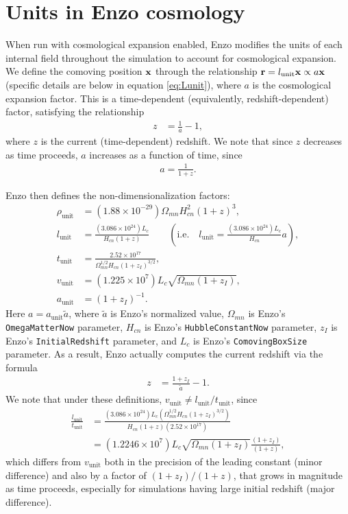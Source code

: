 \documentclass[10pt]{article}
\renewcommand{\(}{\left(}
\renewcommand{\)}{\right)}
\newcommand{\xvec}{{\bf x}}
\newcommand{\rvec}{{\bf r}}
\newcommand{\Aunit}{a_{\text{unit}}}
\newcommand{\Lunit}{l_{\text{unit}}}
\newcommand{\Dunit}{\rho_{\text{unit}}}
\newcommand{\Tunit}{t_{\text{unit}}}
\newcommand{\Vunit}{v_{\text{unit}}}
\newcommand{\tA}{\tilde{a}}
\begin{document}
\section{Units in Enzo cosmology}
\label{sec:units}

When run with cosmological expansion enabled, Enzo modifies the
units of each internal field throughout the simulation to account for
cosmological expansion.  We define the comoving position $\xvec$
through the relationship $\rvec = \Lunit\xvec \propto a \xvec$
(specific details are below in equation \eqref{eq:Lunit}), where $a$
is the cosmological expansion factor.  This is a time-dependent
(equivalently, redshift-dependent) factor, satisfying the relationship
\begin{align}
  \label{eq:CurrentRedshift}
  z &= \frac{1}{a} - 1,
\end{align}
where $z$ is the current (time-dependent) redshift.  We note that
since $z$ decreases as time proceeds, $a$ increases as a function of
time, since 
\begin{align}
  \label{eq:expansion_factor}
  a = \frac{1}{1+z}.
\end{align}

Enzo then defines the non-dimensionalization factors:
\begin{align}
  \label{eq:Dunit}
  \Dunit &= (1.88\times10^{-29}) \Omega_{mn} H_{cn}^2 (1 + z)^3, \\
  \label{eq:Lunit}
  \Lunit &= \frac{(3.086\times10^{24}) L_c}{H_{cn} (1 + z)}
          \qquad \left(\text{i.e.}\quad \Lunit = \frac{(3.086\times10^{24}) L_c}{H_{cn}}a\right), \\
  \label{eq:Tunit}
  \Tunit &= \frac{2.52\times10^{17}}{\Omega_{mn}^{1/2} H_{cn} (1 + z_I)^{3/2}}, \\
  \label{eq:Vunit}
  \Vunit &= (1.225\times10^{7}) L_c \sqrt{\Omega_{mn}(1 + z_I)}, \\
  \label{eq:Aunit}
  \Aunit &= (1+z_I)^{-1}.
\end{align}
Here $a = \Aunit \tA$, where $\tA$ is Enzo's normalized value,  
$\Omega_{mn}$ is Enzo's {\tt OmegaMatterNow} parameter, 
$H_{cn}$ is Enzo's {\tt HubbleConstantNow} parameter, 
$z_I$ is Enzo's {\tt InitialRedshift} parameter, and
$L_c$ is Enzo's {\tt ComovingBoxSize} parameter.
As a result, Enzo actually computes the current redshift via the
formula 
\begin{align}
  \label{eq:CurrentRedshiftFormula}
  z &= \frac{1 + z_I}{\tA} - 1.
\end{align}
We note that under these definitions, $\Vunit \ne \Lunit / \Tunit$, since
\begin{align*}
   \frac{\Lunit}{\Tunit} &= 
   \frac{(3.086\times10^{24}) L_c \left(\Omega_{mn}^{1/2} H_{cn} (1 + z_I)^{3/2}\right)}
         {H_{cn} (1 + z)\left(2.52\times10^{17}\right)} \\
   &= 
   (1.2246\times10^{7}) L_c \sqrt{\Omega_{mn}(1 + z_I)} \frac{(1 + z_I)}{(1 + z)},
\end{align*}
which differs from $\Vunit$ both in the precision of the leading
constant (minor difference) and also by a factor of $(1+z_I)/(1+z)$, that grows
in magnitude as time proceeds, especially for simulations having large
initial redshift (major difference).
\end{document}
